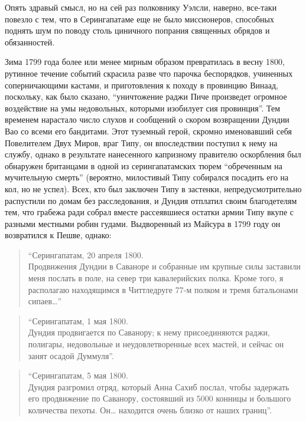 \documentclass[
  oneside,
  12pt,
  titlepage]{book}
\begin{document}
Опять здравый смысл, но на сей раз полковнику Уэлсли, наверно, все-таки повезло с тем, что в Серингапатаме еще не было миссионеров, способных поднять шум по поводу столь циничного попрания священных обрядов и обязанностей.

Зима 1799 года более или менее мирным образом превратилась в весну 1800, рутинное течение событий скрасила разве что парочка беспорядков, учиненных соперничающими кастами, и приготовления к походу в провинцию Винаад, поскольку, как было сказано, ``уничтожение раджи Пиче произведет огромное воздействие на умы недовольных, которыми изобилует сия провинция''. Тем временем нарастало число слухов и сообщений о скором возвращении Дундии Вао со всеми его бандитами. Этот туземный герой, скромно именовавший себя Повелителем Двух Миров, враг Типу, он впоследствии поступил к нему на службу, однако в результате нанесенного капризному правителю оскорбления был обнаружен британцами в одной из серингапатамских тюрем ``обреченным на мучительную смерть'' (вероятно, милостивый Типу собирался посадить его на кол, но не успел). Всех, кто был заключен Типу в застенки, непредусмотрительно распустили по домам без расследования, и Дундия отплатил своим благодетелям тем, что грабежа ради собрал вместе рассеявшиеся остатки армии Типу вкупе с разными местными робин гудами. Выдворенный из Майсура в 1799 году он возвратился к Пешве, однако:

\begin{quote}
``Серингапатам, 20 апреля 1800.\\
Продвижения Дундии в Саваноре и собранные им крупные силы заставили меня послать в поле, на север три кавалерийских полка. Кроме того, я располагаю находящимся в Читтледруге 77-м полком и тремя батальонами сипаев\ldots{}''
\end{quote}

\begin{quote}
``Серингапатам, 1 мая 1800.\\
Дундия продвигается по Саванору; к нему присоединяются раджи, полигары, недовольные и неудовлетворенные всех мастей, и сейчас он занят осадой Думмуля''.
\end{quote}

\begin{quote}
``Серингапатам, 5 мая 1800.\\
Дундия разгромил отряд, который Анна Сахиб послал, чтобы задержать его продвижение по Саванору, состоявший из 5000 конницы и большого количества пехоты. Он\ldots{} находится очень близко от наших границ''.
\end{quote}
\end{document}
